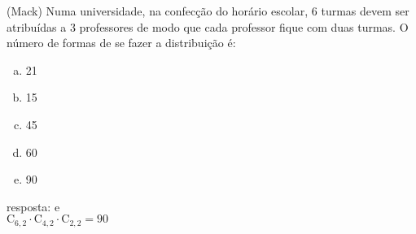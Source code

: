 \begin{ex}
 (Mack) Numa universidade, na confecção do horário escolar, 6 turmas devem ser atribuídas a 3 professores de modo que cada professor fique com duas turmas. O número de formas de se fazer a distribuição é:
    \begin{enumerate}[(a)]
    \item 21
    \item 15
    \item 45
    \item 60
    \item 90
    \end{enumerate}
      \begin{sol}
       resposta: e \\
       $\mathrm{C}_{6,2}\cdot\mathrm{C}_{4,2}\cdot\mathrm{C}_{2,2}=90$
      \end{sol}
\end{ex}